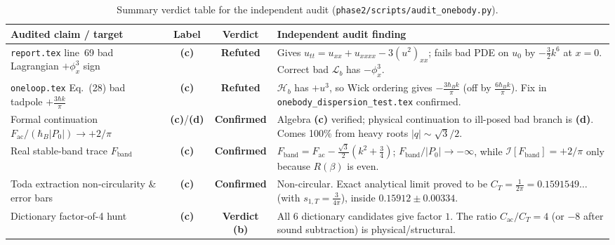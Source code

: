 \documentclass[11pt,a4paper]{article}
\newcommand{\claim}[1]{\textbf{(#1)}}
\begin{document}
\begin{table}[ht!]
\centering
\small
\begin{tabular}{@{}p{4.3cm}ccp{6.8cm}@{}}
\toprule
Audited claim / target & Label & Verdict & Independent audit finding \\
\midrule
\texttt{report.tex} line~69 bad Lagrangian $+\phi_x^3$ sign & \claim{c} & \textbf{Refuted} & Gives $u_{tt}=u_{xx}+u_{xxxx}-3(u^2)_{xx}$; fails bad PDE on $u_0$ by $-\frac{3}{2}k^6$ at $x=0$. Correct bad $\mathcal{L}_b$ has $-\phi_x^3$. \\
\texttt{oneloop.tex} Eq.~(28) bad tadpole $+\frac{3\hbar k}{\pi}$ & \claim{c} & \textbf{Refuted} & $\mathcal{H}_b$ has $+u^3$, so Wick ordering gives $-\frac{3\hbar_B k}{\pi}$ (off by $\frac{6\hbar_B k}{\pi}$). Fix in \texttt{onebody\_dispersion\_test.tex} confirmed. \\
Formal continuation $F_{\mathrm{ac}}/(\hbar_B|P_0|) \to +2/\pi$ & \claim{c}/\claim{d} & \textbf{Confirmed} & Algebra \claim{c} verified; physical continuation to ill-posed bad branch is \claim{d}. Comes 100\% from heavy roots $|q|\sim\sqrt{3}/2$. \\
Real stable-band trace $F_{\mathrm{band}}$ & \claim{c} & \textbf{Confirmed} & $F_{\mathrm{band}} = F_{\mathrm{ac}} - \frac{\sqrt{3}}{2}(k^2+\frac{3}{4})$; $F_{\mathrm{band}}/|P_0|\to -\infty$, while $\mathcal{I}[F_{\mathrm{band}}]=+2/\pi$ only because $R(\beta)$ is even. \\
Toda extraction non-circularity \& error bars & \claim{c} & \textbf{Confirmed} & Non-circular. Exact analytical limit proved to be $C_T = \frac{1}{2\pi} = 0.1591549\dots$ (with $s_{1,T}=\frac{3}{4\pi}$), inside $0.15912\pm 0.00334$. \\
Dictionary factor-of-4 hunt & \claim{c} & \textbf{Verdict (b)} & All 6 dictionary candidates give factor $1$. The ratio $C_{\mathrm{ac}}/C_T = 4$ (or $-8$ after sound subtraction) is physical/structural. \\
\bottomrule
\end{tabular}
\caption{Summary verdict table for the independent audit (\texttt{phase2/scripts/audit\_onebody.py}).}
\label{tab:verdict}
\end{table}
\end{document}
